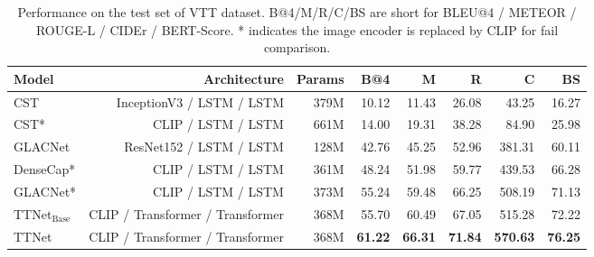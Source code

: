 \begin{table}[ht]
\centering
\small
\caption{Performance on the test set of VTT dataset. B@4/M/R/C/BS are short for BLEU@4 / METEOR / ROUGE-L / CIDEr / BERT-Score. * indicates the image encoder is replaced by CLIP for fail comparison. }
\label{tab:baseline}
\begin{tabular}{lrrrrrrr}
\toprule
Model & Architecture & Params & B@4 & M & R & C & BS \\
\midrule
CST & InceptionV3 / LSTM / LSTM & 379M & 10.12 & 11.43 & 26.08 & 43.25 & 16.27 \\
CST* & CLIP / LSTM / LSTM & 661M & 14.00 & 19.31 & 38.28 & 84.90 & 25.98 \\
GLACNet & ResNet152 / LSTM / LSTM & 128M & 42.76 & 45.25 & 52.96 & 381.31 & 60.11 \\
DenseCap* & CLIP / LSTM / LSTM & 361M & 48.24 & 51.98 & 59.77 & 439.53 & 66.28 \\
GLACNet* & CLIP / LSTM / LSTM & 373M & 55.24 & 59.48 & 66.25 & 508.19 & 71.13 \\
TTNet$_\text{Base}$ & CLIP / Transformer / Transformer & 368M & 55.70 & 60.49 & 67.05 & 515.28 & 72.22 \\
TTNet & CLIP / Transformer / Transformer & 368M & \textbf{61.22} & \textbf{66.31} & \textbf{71.84} & \textbf{570.63} & \textbf{76.25} \\
\bottomrule
\end{tabular}
\end{table}

